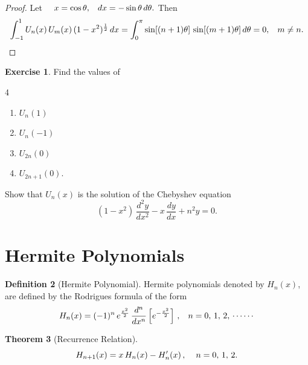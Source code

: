\documentclass[12pt,a4paper]{report}
\theoremstyle{definition}
\newtheorem{thm}{Theorem}[section]
\newtheorem{defn}[thm]{Definition}
\newtheorem{exe}[thm]{Exercise}
\theoremstyle{plain}
\begin{document}
\begin{proof}
Let \, \, $x = \cos \theta, \hspace{0.3cm} dx = -\sin \theta\, d\theta.$ Then 
$$\int_{-1}^1U_n(x)\, U_m(x)\, (1 - x^2)^{\frac{1}{2}}\, dx = \int_0^{\pi}\sin[(n+1)\theta]\,\sin[(m+1)\theta]\, d\theta = 0, \hspace{0.3cm} m\neq n.$$
\end{proof}



\begin{exe}
Find the values of 
\begin{multicols}{4}
\begin{enumerate}
\item[(a).] $U_n(1)$
\item[(b).] $U_n(-1)$
\item[(c).] $U_{2n}(0)$
\item[(d).] $U_{2n + 1}(0).$
\end{enumerate}
\end{multicols}
\end{exe}


Show that $U_n(x)$ is the solution of the Chebyshev equation 
$$(1 - x^2)\, \frac{d^2y}{dx^2} - x\, \frac{dy}{dx} + n^2 y = 0.$$



\section{Hermite Polynomials}
\begin{defn}[Hermite Polynomial]
Hermite polynomials denoted by $H_n(x)$, are defined by the Rodrigues formula of the form 
$$H_n(x) = (-1)^n\, e^{\frac{x^2}{2}}\, \frac{d^n}{dx^n}\left[e^{-\frac{x^2}{2}}\right]\, , \hspace{0.3cm} n = 0, \, 1, \, 2, \, \cdots\cdots$$
\end{defn}



\begin{thm}[Recurrence Relation]
$$H_{n+1}(x) = x\, H_n(x) - H_n'(x)\, , \hspace{0.4cm} n =0, \, 1,\, 2.$$
\end{thm}
\end{document}
